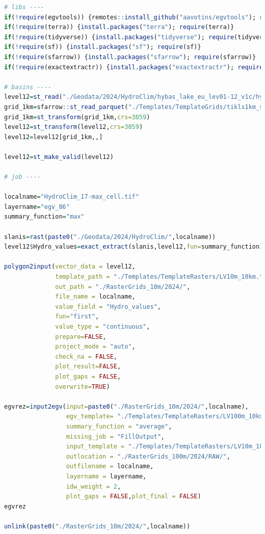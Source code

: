 \documentclass[
]{book}
\begin{document}
\begin{lstlisting}[language=R]
# libs ----
if(!require(egvtools)) {remotes::install_github("aavotins/egvtools"); require(egvtools)}
if(!require(terra)) {install.packages("terra"); require(terra)}
if(!require(tidyverse)) {install.packages("tidyverse"); require(tidyverse)}
if(!require(sf)) {install.packages("sf"); require(sf)}
if(!require(sfarrow)) {install.packages("sfarrow"); require(sfarrow)}
if(!require(exactextractr)) {install.packages("exactextractr"); require(exactextractr)}

# basins ----
level12=st_read("./Geodata/2024/HydroClim/hybas_lake_eu_lev01-12_v1c/hybas_lake_eu_lev12_v1c.shp")
grid_1km=sfarrow::st_read_parquet("./Templates/TemplateGrids/tikls1km_sauzeme.parquet")
grid_1km=st_transform(grid_1km,crs=3059)
level12=st_transform(level12,crs=3059)
level12=level12[grid_1km,,]

level12=st_make_valid(level12)

# job ----

localname="HydroClim_17-max_cell.tif"
layername="egv_86"
summary_function="max"
  
slanis=rast(paste0("./Geodata/2024/HydroClim/",localname))
level12$Hydro_values=exact_extract(slanis,level12,fun=summary_function)
  
polygon2input(vector_data = level12,
              template_path = "./Templates/TemplateRasters/LV10m_10km.tif",
              out_path = "./RasterGrids_10m/2024/",
              file_name = localname,
              value_field = "Hydro_values",
              fun="first",
              value_type = "continuous",
              prepare=FALSE,
              project_mode = "auto",
              check_na = FALSE,
              plot_result=FALSE,
              plot_gaps = FALSE,
              overwrite=TRUE)
  
egvrez=input2egv(input=paste0("./RasterGrids_10m/2024/",localname),
                 egv_template= "./Templates/TemplateRasters/LV100m_10km.tif",
                 summary_function = "average",
                 missing_job = "FillOutput",
                 input_template = "./Templates/TemplateRasters/LV10m_10km.tif",
                 outlocation = "./RasterGrids_100m/2024/RAW/",
                 outfilename = localname,
                 layername = layername,
                 idw_weight = 2,
                 plot_gaps = FALSE,plot_final = FALSE)
egvrez
  
unlink(paste0("./RasterGrids_10m/2024/",localname))
\end{lstlisting}
\end{document}

